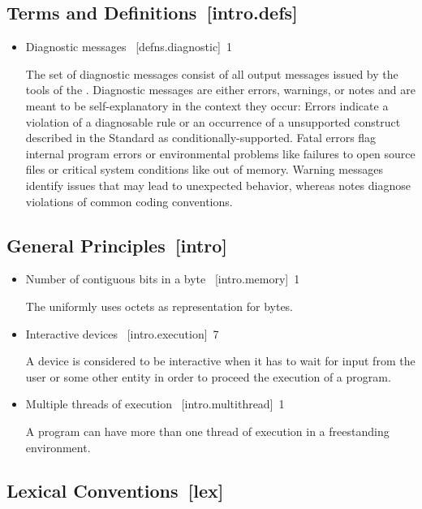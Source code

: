 \newcommand{\cppref}[3]{\alignright#1~[#2]~#3\nopagebreak}
\newcommand{\cppsection}[3]{\subsection[#1]{#1\alignright#2~[#3]}}

\cppsection{Terms and Definitions}{3}{intro.defs}

\begin{itemize}

\item Diagnostic messages \cppref{3.8}{defns.diagnostic}{1}

The set of diagnostic messages consist of all output messages issued by the tools of the \ecs{}.
Diagnostic messages are either errors, warnings, or notes and are meant to be self-explanatory in the context they occur:
Errors indicate a violation of a diagnosable rule or an occurrence of a unsupported construct described in the \cpp{} Standard as conditionally-supported.
Fatal errors flag internal program errors or environmental problems like failures to open source files or critical system conditions like out of memory.
Warning messages identify issues that may lead to unexpected behavior, whereas notes diagnose violations of common coding conventions.

\end{itemize}

\cppsection{General Principles}{4}{intro}

\begin{itemize}

\item Number of contiguous bits in a byte \cppref{4.4}{intro.memory}{1}

The \ecs{} uniformly uses octets as representation for bytes.

\item Interactive devices \cppref{4.6}{intro.execution}{7}

A device is considered to be interactive when it has to wait for input from the user or some other entity in order to proceed the execution of a program.

\item Multiple threads of execution \cppref{4.7}{intro.multithread}{1}

A program can have more than one thread of execution in a freestanding environment.

\end{itemize}

\cppsection{Lexical Conventions}{5}{lex}

